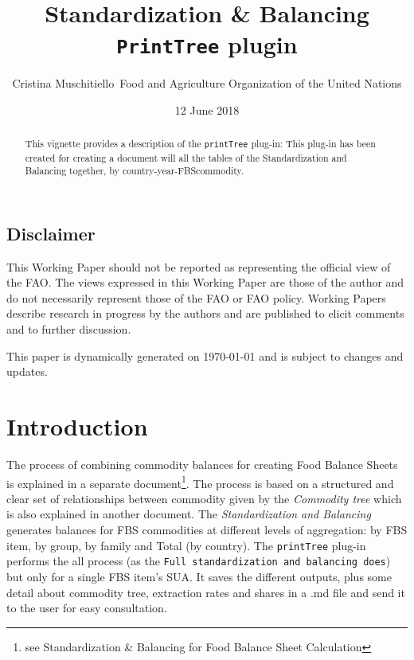 \documentclass[]{article}
\title{Standardization \& Balancing\\
\texttt{PrintTree} plugin}
\author{Cristina Muschitiello~Food and Agriculture Organization of the United
Nations}
\date{12 June 2018}
\let\rmarkdownfootnote\footnote%
\def\footnote{\protect\rmarkdownfootnote}
\begin{document}
\maketitle
\begin{abstract}
This vignette provides a description of the \texttt{printTree} plug-in:
This plug-in has been created for creating a document will all the
tables of the Standardization and Balancing together, by
country-year-FBScommodity.
\end{abstract}

{
\setcounter{tocdepth}{4}
\tableofcontents
}
\newpage

\listoftables

\listoffigures

\subsection*{Disclaimer}\label{disclaimer}

This Working Paper should not be reported as representing the official
view of the FAO. The views expressed in this Working Paper are those of
the author and do not necessarily represent those of the FAO or FAO
policy. Working Papers describe research in progress by the authors and
are published to elicit comments and to further discussion.

This paper is dynamically generated on \today{} and is subject to
changes and updates.

\newpage

\section{Introduction}\label{introduction}

The process of combining commodity balances for creating Food Balance
Sheets is explained in a separate document\footnote{see Standardization
  \& Balancing for Food Balance Sheet Calculation}. The process is based
on a structured and clear set of relationships between commodity given
by the \emph{Commodity tree} which is also explained in another
document. The \emph{Standardization and Balancing} generates balances
for FBS commodities at different levels of aggregation: by FBS item, by
group, by family and Total (by country). The \texttt{printTree} plug-in
performs the all process (as the
\texttt{Full\ standardization\ and\ balancing\ does}) but only for a
single FBS item's SUA. It saves the different outputs, plus some detail
about commodity tree, extraction rates and shares in a .md file and send
it to the user for easy consultation.
\end{document}
